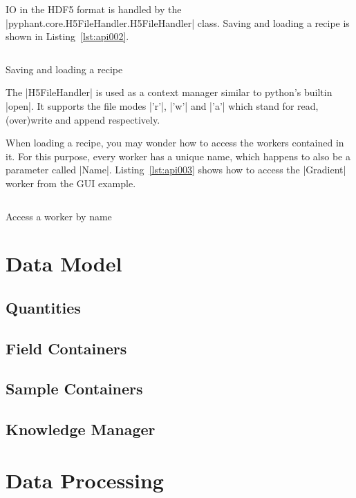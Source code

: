 \documentclass[a4paper]{article}
\begin{document}
IO in the HDF5 format is handled by the
|pyphant.core.H5FileHandler.H5FileHandler| class. Saving and loading a
recipe is shown in Listing~\ref{lst:api002}.

\begin{listing}[h]
  \inputminted[linenos]{python}{api002.py}
  \caption{Saving and loading a recipe}
  \label{lst:api002}
\end{listing}

The |H5FileHandler| is used as a context manager similar to python's
builtin |open|. It supports the file modes |'r'|, |'w'| and |'a'|
which stand for read, (over)write and append respectively.

When loading a recipe, you may wonder how to access the workers
contained in it. For this purpose, every worker has a unique name,
which happens to also be a parameter called
|Name|. Listing~\ref{lst:api003} shows how to access the |Gradient|
worker from the GUI example.

\begin{listing}[h]
  \inputminted[linenos]{python}{api003.py}
  \caption{Access a worker by name}
  \label{lst:api003}
\end{listing}


\section{Data Model}
\label{sec:data_model}

\subsection{Quantities}
\label{sec:data_model_quantities}

\subsection{Field Containers}
\label{sec:data_model_fcs}

\subsection{Sample Containers}
\label{sec:data_model_scs}

\subsection{Knowledge Manager}
\label{sec:data_model_knowledge_manager}

\section{Data Processing}
\label{sec:data_processing}
\end{document}
